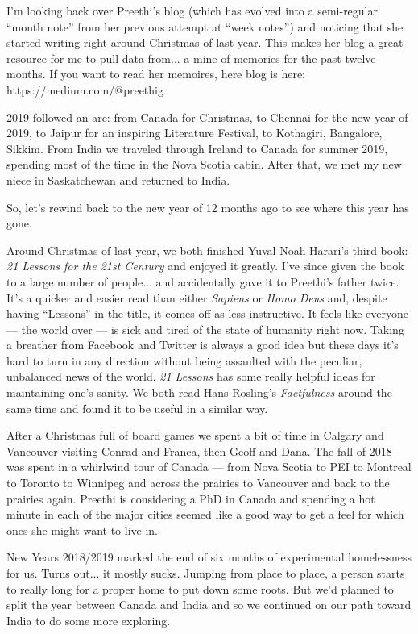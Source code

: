 \documentclass{article}
\begin{document}
I'm looking back over Preethi's blog (which has evolved into a semi-regular ``month
note'' from her previous attempt at ``week notes'') and noticing that she started
writing right around Christmas of last year. This makes her blog a great resource for
me to pull data from... a mine of memories for the past twelve months. If you want to
read her memoires, here blog is here: https://medium.com/@preethig

2019 followed an arc: from Canada for Christmas, to Chennai for the new year of 2019,
to Jaipur for an inspiring Literature Festival, to Kothagiri, Bangalore,
Sikkim. From India we traveled through Ireland to Canada for summer 2019, spending
most of the time in the Nova Scotia cabin. After that, we met my new niece in
Saskatchewan and returned to India.

So, let's rewind back to the new year of 12 months ago to see where this year has gone.

Around Christmas of last year, we both finished Yuval Noah Harari's third book:
\textit{21 Lessons for the 21st Century} and enjoyed it greatly. I've since given the
book to a large number of people... and accidentally gave it to Preethi's father
twice. It's a quicker and easier read than either \textit{Sapiens} or \textit{Homo
  Deus} and, despite having ``Lessons'' in the title, it comes off as less
instructive. It feels like everyone --- the world over --- is sick and tired of the
state of humanity right now. Taking a breather from Facebook and Twitter is always a
good idea but these days it's hard to turn in any direction without being assaulted
with the peculiar, unbalanced news of the world. \textit{21 Lessons} has some really
helpful ideas for maintaining one's sanity. We both read Hans Rosling's
\textit{Factfulness} around the same time and found it to be useful in a similar
way.

After a Christmas full of board games we spent a bit of time in Calgary and Vancouver
visiting Conrad and Franca, then Geoff and Dana. The fall of 2018 was spent in a whirlwind
tour of Canada --- from Nova Scotia to PEI to Montreal to Toronto to Winnipeg and
across the prairies to Vancouver and back to the prairies again. Preethi is
considering a PhD in Canada and spending a hot minute in each of the major cities
seemed like a good way to get a feel for which ones she might want to live in.

New Years 2018/2019 marked the end of six months of experimental homelessness for
us. Turns out... it mostly sucks. Jumping from place to place, a person starts to
really long for a proper home to put down some roots. But we'd planned to split the
year between Canada and India and so we continued on our path toward India to do some
more exploring.
\end{document}
